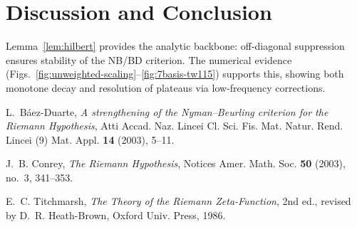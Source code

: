 \documentclass[11pt]{article}
\theoremstyle{remark}
\begin{document}
\section{Discussion and Conclusion}
Lemma~\ref{lem:hilbert} provides the analytic backbone: off-diagonal suppression ensures stability of the NB/BD criterion. The numerical evidence (Figs.~\ref{fig:unweighted-scaling}--\ref{fig:7basis-tw115}) supports this, showing both monotone decay and resolution of plateaus via low-frequency corrections.

\begin{thebibliography}{9}

L.~B\'aez-Duarte, \emph{A strengthening of the Nyman--Beurling criterion for the Riemann Hypothesis}, Atti Accad. Naz. Lincei Cl. Sci. Fis. Mat. Natur. Rend. Lincei (9) Mat. Appl. \textbf{14} (2003), 5--11.

J.~B. Conrey, \emph{The Riemann Hypothesis}, Notices Amer. Math. Soc. \textbf{50} (2003), no.~3, 341--353.

E.~C. Titchmarsh, \emph{The Theory of the Riemann Zeta-Function}, 2nd ed., revised by D.~R. Heath-Brown, Oxford Univ. Press, 1986.

\end{thebibliography}
\end{document}
